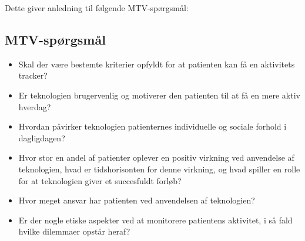 \noindent
Dette giver anledning til følgende MTV-spørgsmål: 


\subsection{MTV-spørgsmål}
\begin{itemize}
\item Skal der være bestemte kriterier opfyldt for at patienten kan få en aktivitets tracker?
\item Er teknologien brugervenlig og motiverer den patienten til at få en mere aktiv hverdag?
\item Hvordan påvirker teknologien patienternes individuelle og sociale forhold i dagligdagen?
\item Hvor stor en andel af patienter oplever en positiv virkning ved anvendelse af teknologien, hvad er tidshorisonten for denne virkning, og hvad spiller en rolle for at teknologien giver et succesfuldt forløb?
\item Hvor meget ansvar har patienten ved anvendelsen af teknologien?
\item Er der nogle etiske aspekter ved at monitorere patientens aktivitet, i så fald hvilke dilemmaer opstår heraf?
\end{itemize} 

